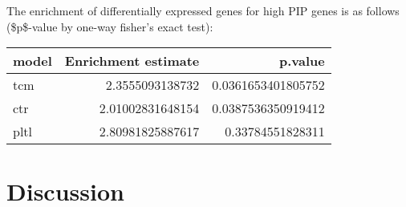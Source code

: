 The enrichment of differentially expressed genes for high PIP genes is as follows (\$p\$-value by one-way fisher's exact test):


\begin{center}
\begin{tabular}{lrr}
model & Enrichment estimate & p.value\\
\hline
tcm & 2.3555093138732 & 0.0361653401805752\\
ctr & 2.01002831648154 & 0.0387536350919412\\
pltl & 2.80981825887617 & 0.33784551828311\\
\end{tabular}
\end{center}


\section{Discussion}\label{sec:org53f1196}

